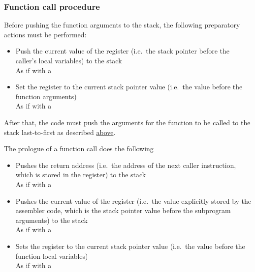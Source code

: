 \hypertarget{functions:call}{
    \subsubsection{Function call procedure}
}

\vspace{-0.2cm}

\hypertarget{functions:prep}{}
Before pushing the function arguments to the stack, the following
preparatory actions must be performed:

\begin{itemize}
    \item Push the current value of the  register
    (i.e.\ the stack pointer before the caller's local variables)
    to the stack \\
    As if with a \hspace{-0.1cm}

    \item Set the  register to the current stack pointer value
    (i.e.\ the value before the function arguments)\\
    As if with a \hspace{-0.1cm}
\end{itemize}

After that, the code must push the arguments for the function to be called
to the stack last-to-first as described \hyperlink{karma:call:basic}{above}.

\hypertarget{functions:prologue}{}
The prologue of a function call does the following

\begin{itemize}
    \item Pushes the return address (i.e.\ the address of the next
    caller instruction, which is stored in the  register)
    to the stack \\
    As if with a \hspace{-0.1cm}

    \item Pushes the current value of the  register (i.e.\ the value
    explicitly stored by the assembler code, which is the stack pointer value
    before the subprogram arguments) to the stack \\
    As if with a \hspace{-0.1cm}

    \item Sets the  register to the current stack pointer value
    (i.e.\ the value before the function local variables) \\
    As if with a \hspace{-0.1cm}
\end{itemize}
